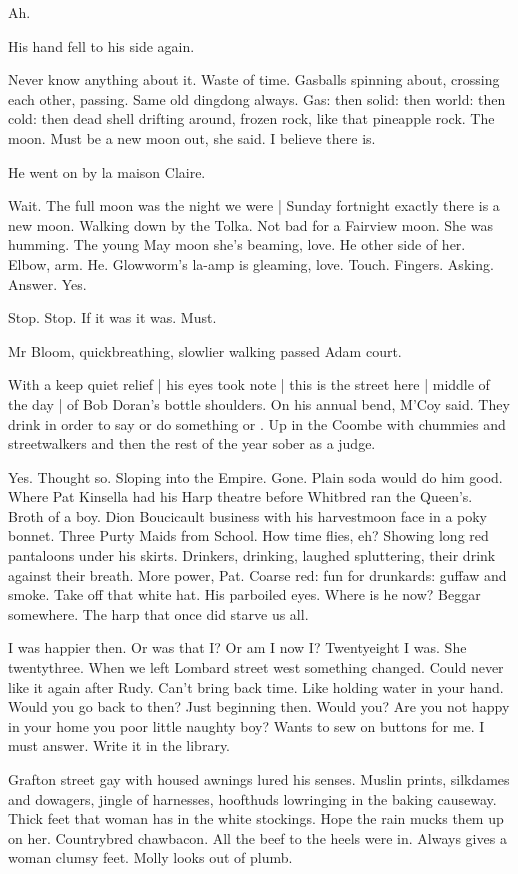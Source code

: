 Ah.

His hand fell to his side again.

Never know anything about it.
Waste of time.
Gasballs spinning about,
crossing each other,
passing.
Same old dingdong always.
Gas:
then solid:
then world:
then cold:
then dead shell drifting around,
frozen rock,
like that pineapple rock.
The moon.
Must be a new moon out,
she said.
I believe there is.

He went on by la maison Claire.

Wait.
The full moon was the night we were |
Sunday fortnight exactly there is a new moon.
Walking down by the Tolka.
Not bad for a Fairview moon.
She was humming.
The young May moon she's beaming,
love.
He other side of her.
Elbow, arm.
He.
Glowworm's la-amp is gleaming, love.
Touch.
Fingers.
Asking.
Answer.
Yes.

Stop.
Stop.
If it was it was.
Must.

Mr Bloom, quickbreathing,
slowlier walking passed Adam court.

With a keep quiet relief |
his eyes took note |
this is the street here |
middle of the day |
of Bob Doran's bottle shoulders.
On his annual bend,
M'Coy said.
They drink in order to say or do something or
.
Up in the Coombe with chummies and streetwalkers
and then the rest of the year sober as a judge.

Yes.
Thought so.
Sloping into the Empire.
Gone.
Plain soda would do him good.
Where Pat Kinsella had his Harp theatre
before Whitbred ran the Queen's.
Broth of a boy.
Dion Boucicault business with his harvestmoon face in a poky bonnet.
Three Purty Maids from School.
How time flies, eh?
Showing long red pantaloons under his skirts.
Drinkers, drinking, laughed spluttering,
their drink against their breath.
More power, Pat.
Coarse red:
fun for drunkards:
guffaw and smoke.
Take off that white hat.
His parboiled eyes.
Where is he now?
Beggar somewhere.
The harp that once did starve us all.

I was happier then.
Or was that I?
Or am I now I?
Twentyeight I was.
She twentythree.
When we left Lombard street west something changed.
Could never like it again after Rudy.
Can't bring back time.
Like holding water in your hand.
Would you go back to then?
Just beginning then.
Would you?
Are you not happy in your home you poor little naughty boy?
Wants to sew on buttons for me.
I must answer.
Write it in the library.

Grafton street gay with housed awnings lured his senses.
Muslin prints, silkdames and dowagers,
jingle of harnesses,
hoofthuds lowringing in the baking causeway.
Thick feet that woman has in the white stockings.
Hope the rain mucks them up on her.
Countrybred chawbacon.
All the beef to the heels were in.
Always gives a woman clumsy feet.
Molly looks out of plumb.

